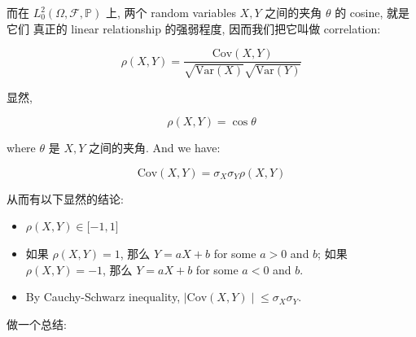 而在 \(\mathit{L}_{0}^{2}(\Omega,\mathcal{F},\mathbb{P})\) 上, 两个 random variables \(\mathit{X},\mathit{Y}\) 之间的夹角 \(\mathit{\theta}\) 的 cosine, 就是它们 真正的 linear relationship 的强弱程度, 因而我们把它叫做 correlation:

\begin{definition}{}

\[\mathit{\rho}(\mathit{X},\mathit{Y}) = \frac{\text{Cov}(X,Y)}{\sqrt{\text{Var}(\mathit{X})}\sqrt{\text{Var}(\mathit{Y})}}\]

\end{definition}

显然,

\[\mathit{\rho}(\mathit{X},\mathit{Y}) = \cos\mathit{\theta}\]

where \(\mathit{\theta}\) 是 \(\mathit{X},\mathit{Y}\) 之间的夹角. And we have:

\[\text{Cov}(\mathit{X},\mathit{Y}) = \mathit{\sigma}_{\mathit{X}}\mathit{\sigma}_{\mathit{Y}}\mathit{\rho}(\mathit{X},\mathit{Y})\]

从而有以下显然的结论:

\begin{proposition}{}

\begin{itemize}
\item
  \(\mathit{\rho}(\mathit{X},\mathit{Y}) \in \lbrack - 1,1\rbrack\)
\item
  如果 \(\mathit{\rho}(\mathit{X},\mathit{Y}) = 1\), 那么 \(\mathit{Y} = \mathit{a}\mathit{X} + \mathit{b}\) for some \(\mathit{a} > 0\) and \(\mathit{b}\); 如果 \(\mathit{\rho}(\mathit{X},\mathit{Y}) = - 1\), 那么 \(\mathit{Y} = \mathit{a}\mathit{X} + \mathit{b}\) for some \(\mathit{a} < 0\) and \(\mathit{b}\).~
\item
  By Cauchy-Schwarz inequality, \(\left. |\text{Cov}(\mathit{X},\mathit{Y}) \middle| \leq \mathit{\sigma}_{\mathit{X}}\mathit{\sigma}_{\mathit{Y}} \right.\).
\end{itemize}

\end{proposition}

做一个总结:

